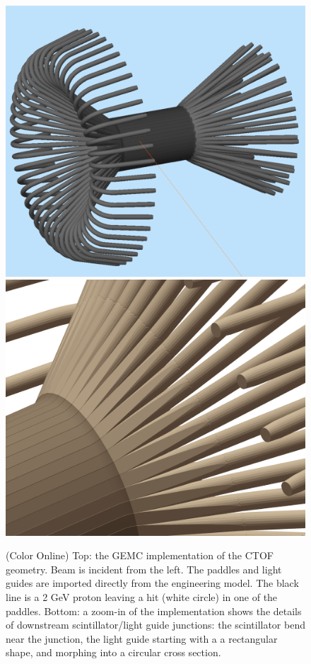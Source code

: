 \begin{figure}
	\centering
	\includegraphics[width=0.99\columnwidth,keepaspectratio]{img/ctofGeometry.png}
	\includegraphics[width=0.99\columnwidth,keepaspectratio]{img/ctofDetail.png}
	\caption{(Color Online) Top: the GEMC implementation of the CTOF geometry. Beam is incident from the left.
	         The paddles and light guides are imported directly from the engineering model.
			 The black line is a 2 GeV proton leaving a hit (white circle) in one of the paddles.
			 Bottom: a zoom-in of the implementation shows the details of downstream scintillator/light guide junctions:
			 the scintillator bend near the junction, the light guide starting with a a rectangular shape, and morphing into a circular cross section.}
	\label{fig:ctofGeometry}
\end{figure}


